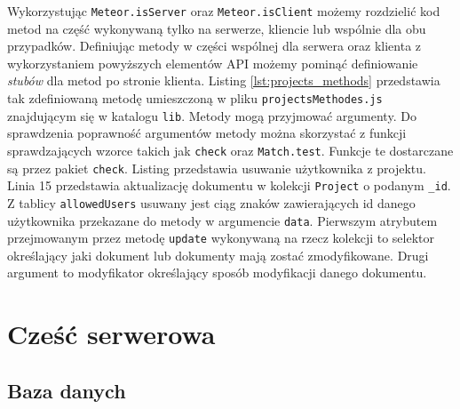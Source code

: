 Wykorzystując \verb|Meteor.isServer| oraz \verb|Meteor.isClient| możemy rozdzielić kod metod na część wykonywaną tylko na serwerze, kliencie lub wspólnie dla obu przypadków. Definiując metody w części wspólnej dla serwera oraz klienta z wykorzystaniem powyższych elementów API możemy pominąć definiowanie \textit{stubów} dla metod po stronie klienta. Listing \ref{lst:projects_methods} przedstawia  tak zdefiniowaną metodę umieszczoną w  pliku \verb|projectsMethodes.js| znajdującym się w katalogu \verb|lib|. Metody mogą przyjmować argumenty. Do sprawdzenia poprawność argumentów metody można skorzystać z funkcji sprawdzających wzorce takich jak \verb|check| oraz \verb|Match.test|. Funkcje te dostarczane są przez pakiet \verb|check|. Listing przedstawia usuwanie użytkownika z projektu. Linia 15 przedstawia aktualizację dokumentu w kolekcji \verb|Project| o podanym \verb|_id|. Z tablicy \verb|allowedUsers| usuwany jest ciąg znaków zawierających id danego użytkownika przekazane do metody w argumencie \verb|data|. Pierwszym atrybutem przejmowanym przez metodę \verb|update| wykonywaną na rzecz kolekcji to selektor określający jaki dokument lub dokumenty mają zostać zmodyfikowane. Drugi argument to modyfikator określający sposób modyfikacji danego dokumentu. 

\section{Cześć serwerowa}
  \subsection{Baza danych}
